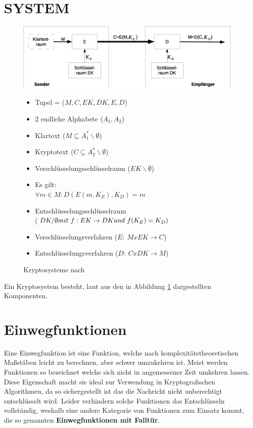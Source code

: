 \documentclass[11pt,a4paper]{scrreprt}
\begin{document}
\section{SYSTEM}
\begin{figure}[hbtp]
\caption{Kryptosysteme nach \cite{Eckert13}}
\centering
\includegraphics[width=\textwidth]{async.eps}
\begin{minipage}[t]{0.45\linewidth}
\centering
\begin{itemize}
\item Tupel = ($M,C,EK,DK,E,D$)
\item 2 endliche Alphabete ($A_1,A_2$)
\item Klartext ($M \subseteq A^*_1\backslash\emptyset$)
\item Kryptotext ($C \subseteq A^*_2\backslash\emptyset$)
\item Verschlüsselungsschlüsselraum ($EK\backslash\emptyset$)
\item Es gilt:
\\ $\forall m\in M : D(E(m,K_E),K_D) = m$
\end{itemize}
\end{minipage}
\begin{minipage}[t]{0.45\linewidth}
\begin{itemize}
\item Entschlüsselungsschlüsselraum\\
($DK/\emptyset \\mit~ f:EK \rightarrow DK \\und~ f(K_E)=K_D)$
\item Verschlüsselungsverfahren ($E :~ M x EK \rightarrow C$)
\item Entschlüsselungsverfahren ($D :~ C x DK \rightarrow M$)
\end{itemize}
\end{minipage}
\label{KryptoSys}
\end{figure}

Ein Kryptosystem besteht, laut \cite{Eckert13} aus den in Abbildung \ref{KryptoSys} dargestellten Komponenten. 

\section{Einwegfunktionen}
Eine Einwegfunktion ist eine Funktion, welche nach komplexitätstheoretischen Maßstäben leicht zu berechnen, aber schwer umzukehren ist. Meist werden Funktionen so bezeichnet welche sich nicht in angemessener Zeit umkehren lassen. Diese Eigenschaft macht sie ideal zur Verwendung in Kryptografischen Algorithmen, da so sichergestellt ist das die Nachricht nicht unberechtigt entschlüsselt wird. Leider verhindern solche Funktionen das Entschlüsseln vollständig, weshalb eine andere Kategorie von Funktionen zum Einsatz kommt, die so genannten \textbf{Einwegfunktionen mit Falltür}.
\end{document}

